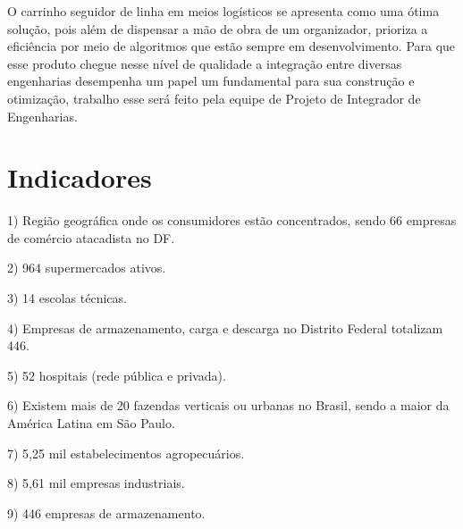{O carrinho seguidor de linha em meios logísticos se apresenta como uma ótima solução, pois além de dispensar a mão de obra de um organizador, prioriza a eficiência por meio de algoritmos que estão sempre em desenvolvimento. Para que esse produto chegue nesse nível de qualidade a integração entre diversas engenharias desempenha um papel um fundamental para sua construção e otimização, trabalho esse será feito pela equipe de Projeto de Integrador de Engenharias.
}

\section{ Indicadores} 

1) Região geográfica onde os consumidores estão concentrados, sendo 66 empresas de comércio atacadista no DF. 

2) 964 supermercados ativos. 

3) 14 escolas técnicas. 

4) Empresas de armazenamento, carga e descarga no Distrito Federal totalizam 446. 

5) 52 hospitais (rede pública e privada). 

6) Existem mais de 20 fazendas verticais ou urbanas no Brasil, sendo a maior da América Latina em São Paulo. 

7) 5,25 mil estabelecimentos agropecuários. 

8) 5,61 mil empresas industriais. 

9) 446 empresas de armazenamento.





